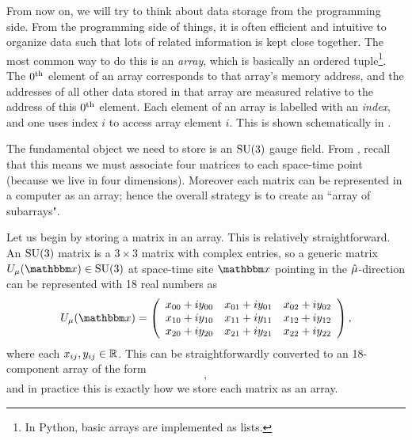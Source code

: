 From now on, we will try to think about data storage from the programming
side. From the programming side of things, it is often efficient and intuitive
to organize data such that lots of related information is kept close together.
The most common way to do this is an {\it array}, which is
basically an ordered tuple\footnote{In Python, basic arrays are implemented as
lists.}. The $0{}^{\rm th}$ element of an array corresponds to that array's memory
address, and the addresses of all other data stored in that array are measured
relative to the address of this $0{}^{\rm th}$ element. Each element of an array is
labelled with an {\it index}, and one uses index $i$ to access array element
$i$. This is shown schematically in .


The fundamental object we need to store is an $\operatorname{SU}(3)$ gauge field.
From , recall that this means we must associate four matrices
to each space-time point (because we live in four dimensions). Moreover each
matrix can be represented in a computer as an array; hence the overall
strategy is to create an ``array of subarrays".

Let us begin by storing a matrix in an array. This is relatively
straightforward. An $\operatorname{SU}(3)$ matrix is a $3\times3$ matrix with complex entries,
so a generic matrix $U_\mu(\fvec{x})\in\SU(3)$ at space-time site $\fvec{x}$
pointing in the $\hat{\mu}$-direction can be represented with 18 real numbers as
\begin{equation}
U_\mu(\fvec{x})=\left(\begin{array}{ccc}
x_{00} + iy_{00} & x_{01} + iy_{01} & x_{02} + iy_{02} \\
x_{10} + iy_{10} & x_{11} + iy_{11} & x_{12} + iy_{12} \\
x_{20} + iy_{20} & x_{21} + iy_{21} & x_{22} + iy_{22} 
\end{array}\right),
\end{equation}
where each $x_{ij},y_{ij}\in\mathbb{R}$. This can be straightforwardly converted to an
18-component array of the form
\begin{equation}
[x_{00},~y_{00},~x_{01},~y_{01},~...,~x_{22},~y_{22}],
\end{equation}
and in practice this is exactly how we store each matrix as an array.

